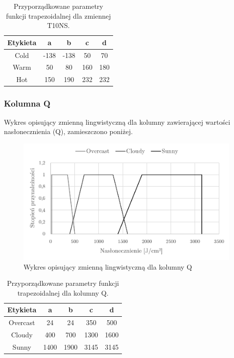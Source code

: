 \documentclass{classrep}
\begin{document}
\begin{table}[H]
	\centering
	\begin{tabular}{c c c c c} 
		\hline
		\textbf{Etykieta} & \textbf{a} & \textbf{b} & \textbf{c} & \textbf{d}\\ [0.5ex] 
		\hline
		\hline 
Cold	 & -138 & -138 & 50 & 70 \\
Warm & 50 & 80 & 160 & 180 \\
Hot	 & 150 & 190 & 232 & 232 \\
		\hline
	\end{tabular}
	\caption{Przyporządkowane parametry funkcji trapezoidalnej dla zmiennej T10NS.}
\end{table}

\clearpage



\subsubsection{Kolumna Q}
Wykres opisujący zmienną lingwistyczną dla kolumny zawierającej wartości nasłonecznienia (Q), zamieszczono poniżej.
\begin{figure}[H]
	\centering
	\includegraphics[width=0.99\textwidth]{Pictures/TermsCharts/Q.png}
	\caption{Wykres opisujący zmienną lingwistyczną dla kolumny Q}
\end{figure}

\begin{table}[H]
	\centering
	\begin{tabular}{c c c c c} 
		\hline
		\textbf{Etykieta} & \textbf{a} & \textbf{b} & \textbf{c} & \textbf{d}\\ [0.5ex] 
		\hline
		\hline 
Overcast	 & 24 & 24 & 350 & 500 \\
Cloudy & 400 & 700 & 1300 & 1600 \\
Sunny	 & 1400 & 1900 & 3145 & 3145 \\
		\hline
	\end{tabular}
	\caption{Przyporządkowane parametry funkcji trapezoidalnej dla kolumny Q.}
\end{table}
\end{document}
